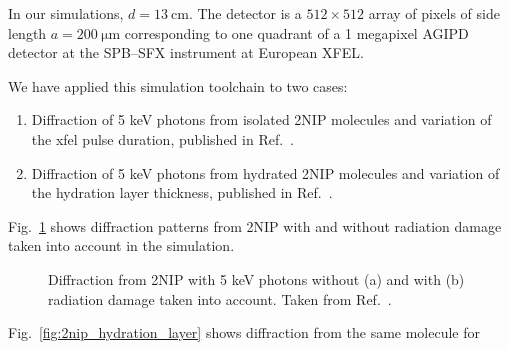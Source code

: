 \documentclass[10pt]{scrartcl}
\begin{document}
In our simulations, $d=\SI{13}{\centi\metre}$. The
detector is a $512\times512$ array of pixels of side length
$a=\SI{200}{\micro\metre}$ corresponding to one quadrant of a 1 megapixel AGIPD
detector \cite{Allahgholi2015} at the SPB--SFX instrument at European XFEL.

We have applied this simulation toolchain to two cases:
\begin{enumerate}
  \item Diffraction of 5 keV photons from isolated 2NIP molecules and variation
    of the \gls{xfel} pulse duration, published in Ref.~\cite{Fortmann-Grote2017}.
  \item Diffraction of 5 keV photons from hydrated 2NIP molecules and variation
    of the hydration layer thickness, published in
    Ref.~\cite{Fortmann-Grote2017b}.
\end{enumerate}
Fig.~\ref{fig:2nip_diffraction_RD_vs_noRD} shows diffraction patterns from
2NIP with and without radiation damage taken into account in the simulation.
%
\begin{figure}[ht]
  \begin{center}
  \end{center}
  \caption{Diffraction from 2NIP with 5 keV photons without (a) and with (b)
  radiation damage taken into account. Taken from
  Ref.~\cite{Fortmann-Grote2017b}.}
  \label{fig:2nip_diffraction_RD_vs_noRD}
\end{figure}
%
Fig.~\ref{fig:2nip_hydration_layer} shows diffraction from the same molecule for
\end{document}
